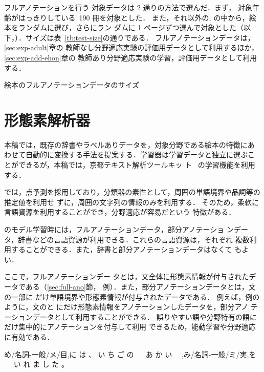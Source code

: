 \documentclass[japanese]{jnlp_1.4}
\newcommand{\ehon}{}
\newcommand{\first}{}
\newcommand{\kodomo}{}
\newcommand{\kytea}{}
\newcommand{\random}{}
\newcommand{\refs}[1]{}
\newcommand{\ul}{}
\begin{document}
フルアノテーションを行う
対象データは 2 通りの方法で選んだ．まず，
対象年齢がはっきりしている\kodomo\ 190 冊を対象とした．
また，それ以外の\first, \ehon の中から，絵本をランダムに選び，さらにラン
ダムに 1 ページずつ選んで対象とした（以下，\random）．サイズは表~\ref{tb:test-size}の通りである．
フルアノテーションデータは，\ref{sec:exp-adult}章の
教師なし分野適応実験の評価用データとして利用するほか，
\ref{sec:exp-add-ehon}章の
教師あり分野適応実験の学習，評価用データとして利用する．

\begin{table}[t]
\caption{絵本のフルアノテーションデータのサイズ}
\label{tb:test-size}

\end{table}


\section{形態素解析器}
\label{sec:morph-kytea}

本稿では，既存の辞書やラベルありデータを，対象分野である絵本の特徴にあ
わせて自動的に変換する手法を提案する．学習器は学習データと独立に選ぶこ
とができるが，本稿では，京都テキスト解析ツールキッ
ト\kytea\ \cite{Mori:Nakata:Graham:Kawahara:2011j} の学習機能を利用する．

\kytea では，点予測を採用しており，分類器の素性として，周囲の単語境界や品詞等の推定値を利用せ
ずに，周囲の文字列の情報のみを利用する．
そのため，柔軟に言語資源を利用することができ，分野適応が容易だという
特徴がある\cite{Mori:Nakata:Graham:Kawahara:2011j}．


\kytea のモデル学習時には，フルアノテーションデータ，部分アノテーショ
ンデータ，辞書などの言語資源が利用できる．これらの言語資源は，それぞれ
複数利用することができる．また，辞書と部分アノテーションデータはなくて
もよい．

ここで，フルアノテーションデー
タとは，文全体に形態素情報が付与されたデータである（\ref{sec:full-ano}節，
例\refs{ehon-full}）．また，部分アノテーションデータとは，文の一部に
だけ単語境界や形態素情報が付与されたデータである．
例えば，例\refs{ehon-part}のように，文\refs{eva-org}の\jpn[め]{}と
\jpn[み]{}にだけ形態素情報をアノテーションしたデータを，部分アノ
テーションデータとして利用することができる．
誤りやすい語や分野特有の語にだけ集中的にアノテーションを付与して利用
できるため，能動学習や分野適応に有効である．
 \begin{exe}
 \ex \label{s:ehon-part}
め/名詞-一般/メ/\ul{目},に は 、 い ち ご の 　 あ か い 　,み/名詞-一般/ミ/\ul{実},を 　 い れ ま し た 。
 \end{exe}
\end{document}
